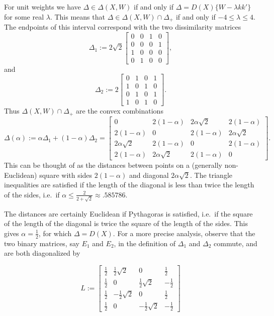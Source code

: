 \documentclass[
  12pt,
  letterpaper,
  DIV=11,
  numbers=noendperiod]{scrreprt}
\theoremstyle{remark}
\begin{document}
For unit weights we have \(\Delta\in\Delta(X,W)\) if and only if
\(\Delta=D(X)\{W-\lambda kk'\}\) for some real \(\lambda\). This means
that \(\Delta\in\Delta(X,W)\cap\Delta_+\) if and only if
\(-4\leq\lambda\leq 4\). The endpoints of this interval correspond with
the two dissimilarity matrices \[
\Delta_1:=2\sqrt{2}\begin{bmatrix}0&0&1&0\\0&0&0&1\\1&0&0&0\\0&1&0&0\end{bmatrix},
\] and \[
\Delta_2:=2\begin{bmatrix}0&1&0&1\\1&0&1&0\\0&1&0&1\\1&0&1&0\end{bmatrix}.
\] Thus \(\Delta(X,W)\cap\Delta_+\) are the convex combinations \[
\Delta(\alpha):=\alpha\Delta_1+(1-\alpha)\Delta_2=
\begin{bmatrix}0&2(1-\alpha)&2\alpha\sqrt{2}&2(1-\alpha)\\2(1-\alpha)&0&2(1-\alpha)&2\alpha\sqrt{2}\\2\alpha\sqrt{2}&2(1-\alpha)&0&2(1-\alpha)\\2(1-\alpha)&2\alpha\sqrt{2}&2(1-\alpha)&0\end{bmatrix}.
\] This can be thought of as the distances between points on a
(generally non-Euclidean) square with sides \(2(1-\alpha)\) and diagonal
\(2\alpha\sqrt{2}\). The triangle inequalities are satisfied if the
length of the diagonal is less than twice the length of the sides,
i.e.~if \(\alpha\leq\frac{2}{2+\sqrt{2}}\approx .585786\).

The distances are certainly Euclidean if Pythagoras is satisfied,
i.e.~if the square of the length of the diagonal is twice the square of
the length of the sides. This gives \(\alpha=\frac12\), for which
\(\Delta=D(X)\). For a more precise analysis, observe that the two
binary matrices, say \(E_1\) and \(E_2\), in the definition of
\(\Delta_1\) and \(\Delta_2\) commute, and are both diagonalized by

\[
L:=\begin{bmatrix}
\frac12&\frac12\sqrt{2}&0&\frac12\\
\frac12&0&\frac12\sqrt{2}&-\frac12\\
\frac12&-\frac12\sqrt{2}&0&\frac12\\
\frac12&0&-\frac12\sqrt{2}&-\frac12
\end{bmatrix}
\]
\end{document}
